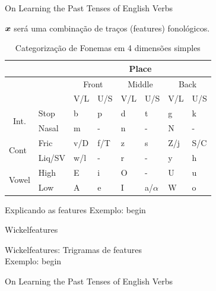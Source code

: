 \documentclass[10pt]{beamer}
\begin{document}
\begin{frame}[fragile]{On Learning the Past Tenses of English Verbs}

$\bm{x}$ será uma combinação de traços (features) fonológicos.

\begin{table}[]
\centering
\caption{Categorização de Fonemas em 4 dimensões simples}
\label{fontable}
\begin{tabular}{llllllll}
\hline
 &  & \multicolumn{6}{c}{Place} \\ \hline
 &  & \multicolumn{2}{c|}{Front} & \multicolumn{2}{c|}{Middle} & \multicolumn{2}{c}{Back} \\ \hline
 &  & \multicolumn{1}{l|}{V/L} & \multicolumn{1}{l|}{U/S} & \multicolumn{1}{l|}{V/L} & \multicolumn{1}{l|}{U/S} & \multicolumn{1}{l|}{V/L} & U/S \\ \hline
 \multicolumn{1}{c}{\multirow{2}{*}{Int.}} & Stop & b & p & d & t & g & k \\ \cline{2-8} 
\multicolumn{1}{c}{} & Nasal & m & - & n & - & N & - \\ \hline
\multirow{2}{*}{Cont} & Fric & v/D & f/T & z & s & Z/j & S/C \\ \cline{2-8} 
 & Liq/SV & w/l & - & r & - & y & h \\ \hline
 \multirow{2}{*}{Vowel} & High & E & i & O & - & U & u \\ \cline{2-8} 
 & Low & A & e & I & a/$\alpha$ & W & o \\ \hline
\end{tabular}
\end{table}

\end{frame}

\begin{frame}[fragile]{Explicando as features}
Exemplo: begin
\vspace{1cm}
\\


\end{frame}

\begin{frame}[fragile]{Wickelfeatures}

Wickelfeatures: Trigramas de features
\vspace{0.4cm}
\\Exemplo: begin

\end{frame}



\begin{frame}[fragile]{On Learning the Past Tenses of English Verbs}

\end{frame}
\end{document}
